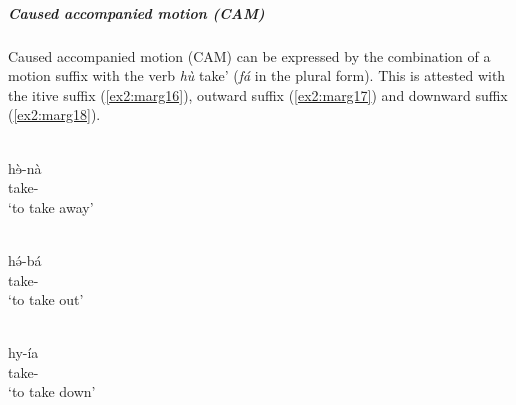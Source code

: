 
%

\subparagraph{Caused accompanied motion (CAM)}

Caused accompanied motion (CAM) can be expressed by the combination of a motion suffix with the verb \textit{hù} take' (\textit{fá} in the plural form). This is attested with the itive suffix (\ref{ex2:marg16}), outward suffix (\ref{ex2:marg17}) and downward suffix (\ref{ex2:marg18}). 

\ea\label{ex2:marg16}
 \\
\gll  hɘ̀-nà \\
take- \\
\glt `to take away'

\ex\label{ex2:marg17}
 \\
\gll hə́-bá \\
take- \\
\glt `to take out'

\ex\label{ex2:marg18}
 \\
\gll hy-ía	\\
take-	\\
\glt `to take down'
%
\z

